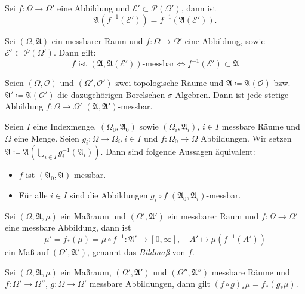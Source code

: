 \documentclass{cheat-sheet}
\newcommand{\Alg}{\mathfrak{A}} %
\begin{document}
\begin{satz}
  Sei $f : \Omega \to \Omega'$ eine Abbildung und $\mathcal{E}' \subset \mathcal{P}(\Omega')$, dann ist
  \[ \Alg(f^{-1}(\mathcal{E}')) = f^{-1}(\Alg(\mathcal{E}')). \]
\end{satz}

\begin{satz}
  Sei $(\Omega, \Alg)$ ein messbarer Raum und $f : \Omega \to \Omega'$ eine Abbildung, sowie $\mathcal{E'} \subset \mathcal{P}(\Omega')$. Dann gilt:
  \[ f \text{ ist } (\Alg, \Alg(\mathcal{E}')) \text{-messbar} \iff f^{-1}(\mathcal{E}') \subset \Alg \]
\end{satz}

\begin{satz}
  Seien $(\Omega, \mathcal{O})$ und $(\Omega', \mathcal{O}')$ zwei topologische Räume und $\Alg \coloneqq \Alg(\mathcal{O})$ bzw. $\Alg' \coloneqq \Alg(\mathcal{O}')$ die dazugehörigen Borelschen $\sigma$-Algebren. Dann ist jede stetige Abbildung $f : \Omega \to \Omega'$ $(\Alg, \Alg')$-messbar.
\end{satz}


\begin{satz}[Projektionssatz]
  Seien $I$ eine Indexmenge, $(\Omega_0, \Alg_0)$ sowie $(\Omega_i, \Alg_i)$, $i \in I$ messbare Räume und $\Omega$ eine Menge. Seien $g_i : \Omega \to \Omega_i, i \in I$ und $f : \Omega_0 \to \Omega$ Abbildungen. Wir setzen $\Alg \coloneqq \Alg\left( \bigcup_{i \in I} g_i^{-1}(\Alg_i) \right)$. Dann sind folgende Aussagen äquivalent:
  \begin{itemize}
    \item $f$ ist $(\Alg_0, \Alg)$-messbar.
    \item Für alle $i \in I$ sind die Abbildungen $g_i \circ f$ $(\Alg_0, \Alg_i)$-messbar.
  \end{itemize}
\end{satz}

\begin{satz}
  Sei $(\Omega, \Alg, \mu)$ ein Maßraum und $(\Omega', \Alg')$ ein messbarer Raum und $f : \Omega \to \Omega'$ eine messbare Abbildung, dann ist
  \[ \mu' = f_*(\mu) = \mu \circ f^{-1} : \Alg' \to [0, \infty], \quad A' \mapsto \mu(f^{-1}(A')) \]
  ein Maß auf $(\Omega', \Alg')$, genannt das \emph{Bildmaß} von $f$.
\end{satz}

\begin{bem}
  Sei $(\Omega, \Alg, \mu)$ ein Maßraum, $(\Omega', \Alg')$ und $(\Omega'', \Alg'')$ messbare Räume und $f : \Omega' \to \Omega''$, $g : \Omega \to \Omega'$ messbare Abbildungen, dann gilt $(f \circ g)_* \mu = f_*(g_* \mu)$.
\end{bem}
\end{document}
